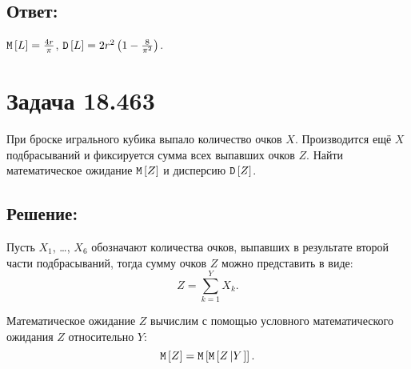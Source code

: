 \subsection*{Ответ:}
$\mathtt{M} \left [ L \right ] = \frac{4 r}{\pi}$, $\mathtt{D} \left [ L \right ] = 2 r^2 \left ( 1 - \frac{8}{\pi^2} \right )$.

\section*{Задача 18.463}
При броске игрального кубика выпало количество очков $X$. Производится ещё $X$ подбрасываний и фиксируется сумма всех выпавших очков $Z$.
Найти математическое ожидание $\mathtt{M} \left [ Z \right ]$ и дисперсию $\mathtt{D} \left [ Z \right ]$.

\subsection*{Решение:}
Пусть $X_1$, \dots, $X_6$ обозначают количества очков, выпавших в результате второй части подбрасываний, тогда сумму очков $Z$ можно представить
в виде:
\begin{equation}
    Z
    = \sum_{k=1}^Y X_k .
\end{equation}

Математическое ожидание $Z$ вычислим с помощью условного математического ожидания $Z$ относительно $Y$:
\begin{equation}
    \mathtt{M} \left [ Z \right ]
    = \mathtt{M} \left [ \mathtt{M} \left [ Z \left | Y \right . \right ] \right ].
\end{equation}

